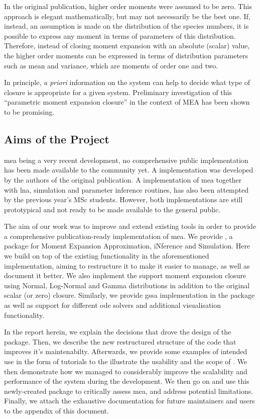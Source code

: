 In the original publication\cite{ale_general_2013}, higher order moments were assumed to be zero. 
This approach is elegant mathematically, but may not necessarily be the best one.
If, instead, an assumption is made on the distribution of the species numbers, it is possible
to express any moment in terms of parameters of this distribution\cite{milner_moment_2011}.
Therefore, instead of closing moment expansion with an absolute (scalar) value, the higher order moments can be expressed in
terms of distribution parameters such as mean and variance, which are moments of order one and two.

In principle, \emph{a priori} information on the system can help to decide what type of closure is appropriate for a given system.
Preliminary investigation of this ``parametric moment expansion closure'' in the context of MEA has been shown to be promising\cite{lakatos_preparation_2014}.

\subsection{Aims of the Project}

\gls{mea} being a very recent development, no comprehensive public implementation has been made available to the community yet.
A \mat{} implementation was developed by the authors of the original publication. A \py{} implementation of \gls{mea} together with \gls{lna}, simulation and parameter inference routines, has also been attempted by the previous year's MSc students\cite{babtie_moment_2013}.
However, both implementations are still prototypical and not ready to be made available to the general public.
 
The aim of our work was to improve and extend existing tools in order to provide a comprehensive publication-ready implementation of \gls{mea}.
We provide \means{}, a \py{} package for Moment Expansion Approximation, iNference and Simulation. 
Here we build on top of the existing functionality in the aforementioned \py{} implementation, aiming to restructure it to make it easier to manage, as well as document it better. 
We also implement the support moment expansion closure using Normal, Log-Normal and Gamma distributions in addition to the original scalar (or zero) closure. Similarly, we provide \gls{gssa} implementation in the package as well as support for different \gls{ode} solvers and additional visualisation functionality.

In the report herein, we explain the decisions that drove the design of the package.
Then, we describe the new restructured structure of the code that improves it's maintenabilty.
Afterwards, we provide some examples of intended use in the form of tutorials to the illustrate the usability and the scope of \means.
We then demonstrate how we managed to considerably improve the scalability and performance of the system during the development.
We then go on and use this newly-created package to critically assess \gls{mea}, and address potential limitations.
Finally, we attach the exhaustive documentation for future maintainers and users to the appendix of this document.

